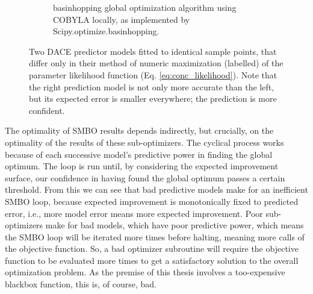\begin{figure}
\begin{subfigure}[t]{0.5\textwidth}
                \caption{basinhopping\cite{} global optimization algorithm using COBYLA\cite{} locally, as implemented by Scipy\linebreak[0].optimize\linebreak[0].basinhopping.}
        \end{subfigure}
        \caption{Two DACE predictor models fitted to identical sample points, that differ only in their method of numeric maximization (labelled) of the parameter likelihood function (Eq. \ref{eq:conc_likelihood}). Note that the right prediction model is not only more accurate than the left, but its expected error is smaller everywhere; the prediction is more confident.}\label{fig:opt_compare}
\end{figure}

The optimality of SMBO results depends indirectly, but crucially, on the optimality of the results of these sub-optimizers. The cyclical process works because of each successive model's predictive power in finding the global optimum. The loop is run until, by considering the expected improvement surface, our confidence in having found the global optimum passes a certain threshold. From this we can see that bad predictive models make for an inefficient SMBO loop, because expected improvement is monotonically fixed to predicted error, i.e., more model error means more expected improvement. Poor sub-optimizers make for bad models, which have poor predictive power, which means the SMBO loop will be iterated more times before halting, meaning more calls of the objective function. So, a bad optimizer subroutine will require the objective function to be evaluated more times to get a satisfactory solution to the overall optimization problem. As the premise of this thesis involves a too-expensive blackbox function, this is, of course, bad.

%




